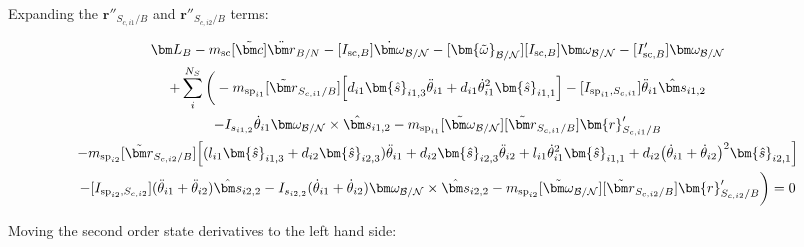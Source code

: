 Expanding the $\bm{r}''_{S_{c,i1}/B}$ and $\bm{r}''_{S_{c,i2}/B}$ terms:

\begin{multline}
	\bm L_B - m_{\text{sc}} [\tilde{\bm c}] \ddot{\bm r}_{B/N} -[I_{\text{sc},B}] \dot{\bm\omega}_{\cal B/N} -[\bm{\tilde{\omega}}_{\cal B/N}] [I_{\text{sc},B}] \bm\omega_{\cal B/N} - [I'_{\text{sc},B}] \bm\omega_{\cal B/N}
	\\
	+ \sum\limits_{i}^{N_S}\bigg(
	- m_{\text{sp}_{i1}} [\tilde{{\bm r}}_{S_{c,i1}/B}] \Big[d_{i1} \bm{\hat{s}}_{i1,3} \ddot{\theta}_{i1} + d_{i1} \dot{\theta}_{i1}^2 \bm{\hat{s}}_{i1,1} \Big]
	-[I_{\text{sp}_{i1},S_{c,i1}}] \ddot{\theta}_{i1} \hat{\bm s}_{i1,2}
	\\-I_{s_{i1,2}} \dot{\theta}_{i1} \bm \omega_{\cal{B/N}} \times \hat{\bm s}_{i1,2} - m_{\text{sp}_{i1}} [\tilde{\bm\omega}_{\cal B/N}] [\tilde{{\bm r}}_{S_{c,i1}/B}] \bm{r}'_{S_{c,i1}/B}
	\\
	- m_{\text{sp}_{i2}} [\tilde{{\bm r}}_{S_{c,i2}/B}] \Big[(l_{i1} \bm{\hat{s}}_{i1,3} + d_{i2} \bm{\hat{s}}_{i2,3}) \ddot{\theta}_{i1} + d_{i2} \bm{\hat{s}}_{i2,3} \ddot{\theta}_{i2} + l_{i1} \dot{\theta}_{i1}^2 \bm{\hat{s}}_{i1,1} + d_{i2}\big(\dot{\theta}_{i1} + \dot{\theta}_{i2}\big)^2\bm{\hat{s}}_{i2,1}\Big]\\
	-[I_{\text{sp}_{i2},S_{c,i2}}] (\ddot{\theta}_{i1}  + \ddot{\theta}_{i2})\hat{\bm s}_{i2,2}
	-I_{s_{i2,2}}  (\dot{\theta}_{i1}  + \dot{\theta}_{i2}) \bm \omega_{\cal{B/N}} \times \hat{\bm s}_{i2,2} - m_{\text{sp}_{i2}} [\tilde{\bm\omega}_{\cal B/N}] [\tilde{{\bm r}}_{S_{c,i2}/B}] \bm{r}'_{S_{c,i2}/B} \bigg) = 0
\end{multline}

Moving the second order state derivatives to the left hand side:

